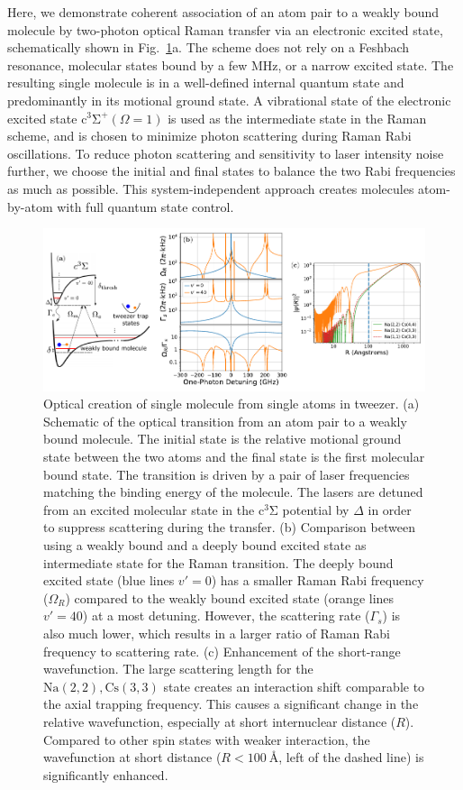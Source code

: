 \documentclass[aps,prl,twocolumn,10pt,superscriptaddress]{revtex4-1}
\newcommand{\Na}{\mathrm{Na}}
\newcommand{\Cs}{\mathrm{Cs}}
\begin{document}
Here, we demonstrate coherent association of an atom pair to a weakly bound molecule
by two-photon optical Raman transfer via an electronic excited state,
schematically shown in Fig.~\ref{f-theory}a.
The scheme does not rely on a Feshbach resonance,
molecular states bound by a few MHz, or a narrow excited state.
The resulting single molecule is in a well-defined internal quantum state
and predominantly in its motional ground state.
A vibrational state of the electronic excited state $\mathrm{c^3\Sigma^+}(\Omega = 1)$
is used as the intermediate state in the Raman scheme,
and is chosen to minimize photon scattering during Raman Rabi oscillations.
To reduce photon scattering and sensitivity to laser intensity noise further,
we choose the initial and final states to balance the two Rabi frequencies as much as possible.
This system-independent approach creates molecules atom-by-atom with full quantum state control.


\begin{figure}
  \includegraphics[width=\textwidth]{imgs/fig-theory.pdf}
  \caption{Optical creation of single molecule from single atoms in tweezer.
    (a) Schematic of the optical transition from an atom pair to a weakly bound molecule.
    The initial state is the relative motional ground state between the two atoms
    and the final state is the first molecular bound state.
    The transition is driven by a pair of laser frequencies matching the binding energy
    of the molecule.
    The lasers are detuned from an excited molecular state in the $\mathrm{c^3\Sigma}$ potential
    by $\Delta$ in order to suppress scattering during the transfer.
    (b) Comparison between using a weakly bound and a deeply bound excited state
    as intermediate state for the Raman transition.
    The deeply bound excited state (blue lines $v'=0$)
    has a smaller Raman Rabi frequency ($\Omega_{R}$)
    compared to the weakly bound excited state (orange lines $v'=40$) at a most detuning.
    However, the scattering rate ($\Gamma_{s}$) is also much lower,
    which results in a larger ratio of Raman Rabi frequency to scattering rate.
    (c) Enhancement of the short-range wavefunction.
    The large scattering length for the $\Na(2,2),\Cs(3,3)$ state creates an interaction shift
    comparable to the axial trapping frequency.
    This causes a significant change in the relative wavefunction, especially at short
    internuclear distance ($R$).
    Compared to other spin states with weaker interaction,
    the wavefunction at short distance ($R<100\ \text{\AA}$, left of the dashed line)
    is significantly enhanced.
    \label{f-theory}
  }
\end{figure}
\end{document}
